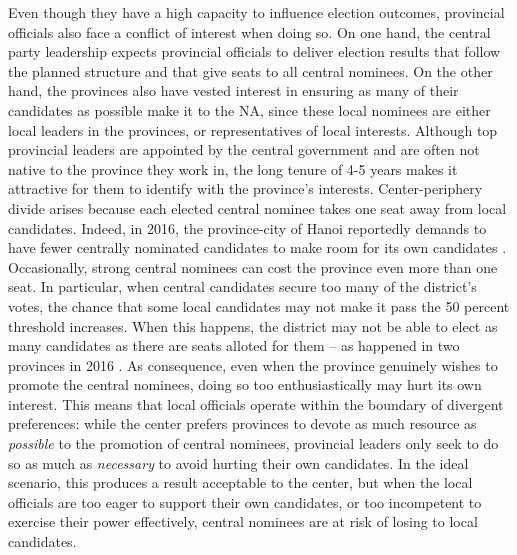 \documentclass[12pt]{article}\usepackage[]{graphicx}\usepackage[]{color}
\newcommand{\1}{\mathbbm{1}}
\begin{document}
Even though they have a high capacity to influence election outcomes, provincial officials also face a conflict of interest when doing so. On one hand, the central party leadership expects provincial officials to deliver election results that follow the planned structure and that give seats to all central nominees. On the other hand, the provinces also have vested interest in ensuring as many of their candidates as possible make it to the NA, since these local nominees are either local leaders in the provinces, or representatives of local interests. Although top provincial leaders are appointed by the central government and are often not native to the province they work in, the long tenure of 4-5 years makes it attractive for them to identify with the province's interests. Center-periphery divide arises because each elected central nominee takes one seat away from local candidates. Indeed, in 2016, the province-city of Hanoi reportedly demands to have fewer centrally nominated candidates to make room for its own candidates \citep{vnexpress2016_2}. Occasionally, strong central nominees can cost the province even more than one seat. In particular, when central candidates secure too many of the district's votes, the chance that some local candidates may not make it pass the 50 percent threshold increases. When this happens, the district may not be able to elect as many candidates as there are seats alloted for them -- as happened in two provinces in 2016 \citep{vnexpress2016}. As consequence, even when the province genuinely wishes to promote the central nominees, doing so too enthusiastically may hurt its own interest. This means that local officials operate within the boundary of divergent preferences: while the center prefers provinces to devote as much resource as \textit{possible} to the promotion of central nominees, provincial leaders only seek to do so as much as \textit{necessary} to avoid hurting their own candidates. In the ideal scenario, this produces a result acceptable to the center, but when the local officials are too eager to support their own candidates, or too incompetent to exercise their power effectively, central nominees are at risk of losing to local candidates.
\end{document}
